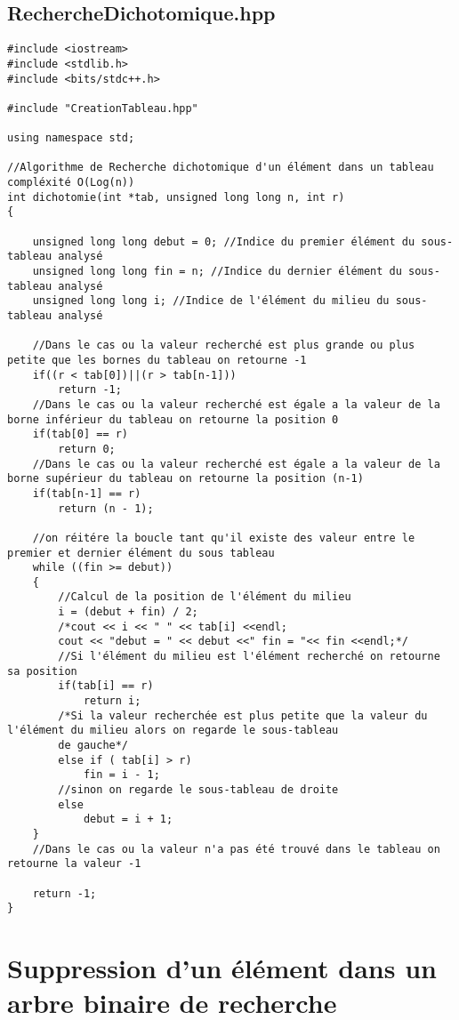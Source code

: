 \subsection{RechercheDichotomique.hpp}
\begin{verbatim}
#include <iostream>
#include <stdlib.h>
#include <bits/stdc++.h>

#include "CreationTableau.hpp"

using namespace std;

//Algorithme de Recherche dichotomique d'un élément dans un tableau compléxité O(Log(n))
int dichotomie(int *tab, unsigned long long n, int r)
{

    unsigned long long debut = 0; //Indice du premier élément du sous-tableau analysé
    unsigned long long fin = n; //Indice du dernier élément du sous-tableau analysé
    unsigned long long i; //Indice de l'élément du milieu du sous-tableau analysé

    //Dans le cas ou la valeur recherché est plus grande ou plus petite que les bornes du tableau on retourne -1
    if((r < tab[0])||(r > tab[n-1]))
        return -1;
    //Dans le cas ou la valeur recherché est égale a la valeur de la borne inférieur du tableau on retourne la position 0
    if(tab[0] == r)
        return 0;
    //Dans le cas ou la valeur recherché est égale a la valeur de la borne supérieur du tableau on retourne la position (n-1)
    if(tab[n-1] == r)
        return (n - 1);

    //on réitére la boucle tant qu'il existe des valeur entre le premier et dernier élément du sous tableau
    while ((fin >= debut))
    {
        //Calcul de la position de l'élément du milieu
        i = (debut + fin) / 2;
        /*cout << i << " " << tab[i] <<endl;
        cout << "debut = " << debut <<" fin = "<< fin <<endl;*/
        //Si l'élément du milieu est l'élément recherché on retourne sa position
        if(tab[i] == r)
            return i;
        /*Si la valeur recherchée est plus petite que la valeur du l'élément du milieu alors on regarde le sous-tableau
        de gauche*/
        else if ( tab[i] > r)
            fin = i - 1;
        //sinon on regarde le sous-tableau de droite
        else
            debut = i + 1;
    }
    //Dans le cas ou la valeur n'a pas été trouvé dans le tableau on retourne la valeur -1

    return -1;
}
\end{verbatim}

\section{Suppression d'un élément dans un arbre binaire de recherche}

